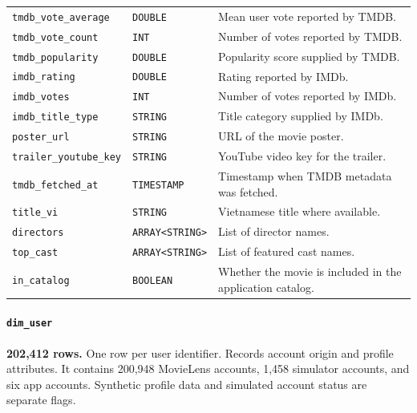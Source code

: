 \documentclass[a4paper,12pt]{article}
\newcommand{\dbsep}{\_\allowbreak}
\begin{document}
\begin{longtable}{@{}>{\raggedright\arraybackslash}p{}
                    >{\raggedright\arraybackslash}p{}
                    >{\raggedright\arraybackslash}p{}@{}}
\texttt{tmdb\dbsep vote\dbsep average} & \texttt{DOUBLE} & Mean user vote reported by TMDB.\\
\texttt{tmdb\dbsep vote\dbsep count} & \texttt{INT} & Number of votes reported by TMDB.\\
\texttt{tmdb\dbsep popularity} & \texttt{DOUBLE} & Popularity score supplied by TMDB.\\
\texttt{imdb\dbsep rating} & \texttt{DOUBLE} & Rating reported by IMDb.\\
\texttt{imdb\dbsep votes} & \texttt{INT} & Number of votes reported by IMDb.\\
\texttt{imdb\dbsep title\dbsep type} & \texttt{STRING} & Title category supplied by IMDb.\\
\texttt{poster\dbsep url} & \texttt{STRING} & URL of the movie poster.\\
\texttt{trailer\dbsep youtube\dbsep key} & \texttt{STRING} & YouTube video key for the trailer.\\
\texttt{tmdb\dbsep fetched\dbsep at} & \texttt{TIMESTAMP} & Timestamp when TMDB metadata was fetched.\\
\texttt{title\dbsep vi} & \texttt{STRING} & Vietnamese title where available.\\
\texttt{directors} & \texttt{ARRAY\allowbreak\textless{}STRING\textgreater{}} & List of director names.\\
\texttt{top\dbsep cast} & \texttt{ARRAY\allowbreak\textless{}STRING\textgreater{}} & List of featured cast names.\\
\texttt{in\dbsep catalog} & \texttt{BOOLEAN} & Whether the movie is included in the application catalog.\\
\end{longtable}
\endgroup

\paragraph{\texttt{dim\dbsep user}}
\textbf{202,412 rows.} One row per user identifier.
Records account origin and profile attributes. It contains 200,948 MovieLens accounts, 1,458 simulator accounts, and six app accounts. Synthetic profile data and simulated account status are separate flags.
\end{document}
